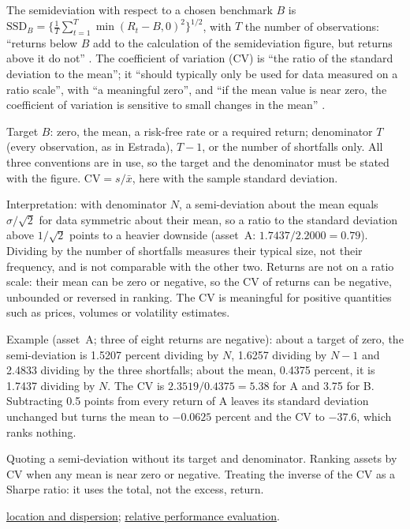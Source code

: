 \begin{qfdefinition}\label{def:downside-relative-dispersion}
 The semideviation with respect to a chosen benchmark $B$ is $\mathrm{SSD}_B=\bigl\{\frac1T\sum_{t=1}^{T}\min(R_t-B,0)^2\bigr\}^{1/2}$, with $T$ the number of observations: ``returns below $B$ add to the calculation of the semideviation figure, but returns above it do not'' \citep[eq.~(1), p.~2]{downside-risk-volatility-2026}. The coefficient of variation (CV) is ``the ratio of the standard deviation to the mean''; it ``should typically only be used for data measured on a ratio scale'', with ``a meaningful zero'', and ``if the mean value is near zero, the coefficient of variation is sensitive to small changes in the mean'' \citep[``Coefficient of Variation'']{coefficient-of-variation-reference-2017}.

 Target $B$: zero, the mean, a risk-free rate or a required return; denominator $T$ (every observation, as in Estrada), $T-1$, or the number of shortfalls only. All three conventions are in use, so the target and the denominator must be stated with the figure. $\mathrm{CV}=s/\bar x$, here with the sample standard deviation.

 Interpretation: with denominator $N$, a semi-deviation about the mean equals $\sigma/\sqrt2$ for data symmetric about their mean, so a ratio to the standard deviation above $1/\sqrt2$ points to a heavier downside (asset~A: $1.7437/2.2000=0.79$). Dividing by the number of shortfalls measures their typical size, not their frequency, and is not comparable with the other two. Returns are not on a ratio scale: their mean can be zero or negative, so the CV of returns can be negative, unbounded or reversed in ranking. The CV is meaningful for positive quantities such as prices, volumes or volatility estimates.

 Example (asset~A; three of eight returns are negative): about a target of zero, the semi-deviation is 1.5207 percent dividing by $N$, 1.6257 dividing by $N-1$ and 2.4833 dividing by the three shortfalls; about the mean, 0.4375 percent, it is 1.7437 dividing by $N$. The CV is $2.3519/0.4375=5.38$ for A and 3.75 for B. Subtracting 0.5 points from every return of A leaves its standard deviation unchanged but turns the mean to $-0.0625$ percent and the CV to $-37.6$, which ranks nothing.

 Quoting a semi-deviation without its target and denominator. Ranking assets by CV when any mean is near zero or negative. Treating the inverse of the CV as a Sharpe ratio: it uses the total, not the excess, return.

 \hyperref[def:return-sample-statistics]{location and dispersion}; \hyperref[meth:relative-performance-evaluation]{relative performance evaluation}.

\end{qfdefinition}
